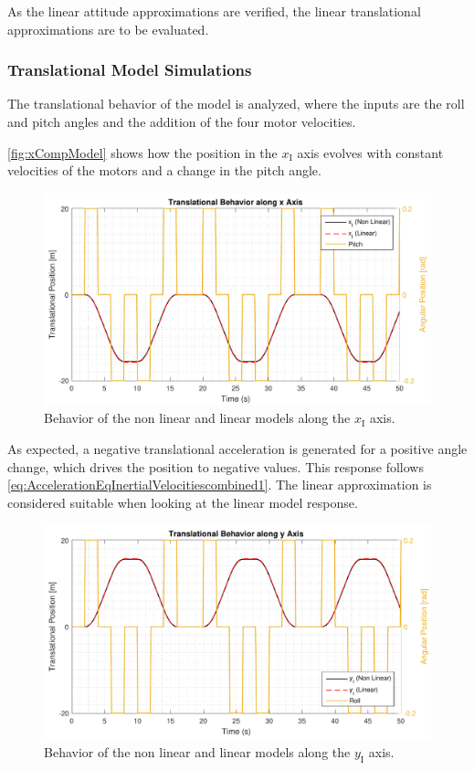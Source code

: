 As the linear attitude approximations are verified, the linear translational approximations are to be evaluated. 
\subsubsection{Translational Model Simulations}
The translational behavior of the model is analyzed, where the inputs are the roll and pitch angles and the addition of the four motor velocities. 

\autoref{fig:xCompModel} shows how the position in the $x_{\mathrm{I}}$ axis evolves with constant velocities of the motors and a change in the pitch angle.
\begin{figure}[H]
	\centering
	\includegraphics[scale=0.65]{figures/xCompModel}
	\caption{Behavior of the non linear and linear models along the $x_{\mathrm{I}}$ axis.}
	\label{fig:xCompModel}
\end{figure}
As expected, a negative translational acceleration is generated for a positive angle change, which drives the position to negative values. This response follows \autoref{eq:AccelerationEqInertialVelocitiescombined1}. The linear approximation is considered suitable when looking at the linear model response.
\begin{figure}[H]
	\centering
	\includegraphics[scale=0.65]{figures/yCompModel}
	\caption{Behavior of the non linear and linear models along the $y_{\mathrm{I}}$ axis.}
	\label{fig:yCompModel}
\end{figure}

